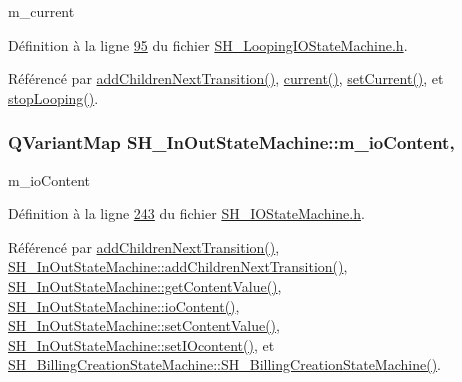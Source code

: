 m\-\_\-current 



Définition à la ligne \hyperlink{SH__LoopingIOStateMachine_8h_source_l00095}{95} du fichier \hyperlink{SH__LoopingIOStateMachine_8h_source}{S\-H\-\_\-\-Looping\-I\-O\-State\-Machine.\-h}.



Référencé par \hyperlink{classSh__LoopingInOutStateMachine_a20d5e4d9feea63bea747b45b7c10ca01}{add\-Children\-Next\-Transition()}, \hyperlink{classSh__LoopingInOutStateMachine_a6c642c84af6988031c4e2a85196eb2e6}{current()}, \hyperlink{classSh__LoopingInOutStateMachine_a48881465e2f21524dc8911ff94a60dca}{set\-Current()}, et \hyperlink{classSh__LoopingInOutStateMachine_a2ddae49a46de3794fd934f830d2388f8}{stop\-Looping()}.

\hypertarget{classSH__InOutStateMachine_a661a1c7bd3b1086b3b5cd60ca957ecbd}{
\subsubsection[{m\-\_\-io\-Content}]{\setlength{\rightskip}{0pt plus 5cm}Q\-Variant\-Map S\-H\-\_\-\-In\-Out\-State\-Machine\-::m\-\_\-io\-Content\hspace{0.3cm}{\ttfamily [protected]}, {\ttfamily [inherited]}}}\label{classSH__InOutStateMachine_a661a1c7bd3b1086b3b5cd60ca957ecbd}


m\-\_\-io\-Content 



Définition à la ligne \hyperlink{SH__IOStateMachine_8h_source_l00243}{243} du fichier \hyperlink{SH__IOStateMachine_8h_source}{S\-H\-\_\-\-I\-O\-State\-Machine.\-h}.



Référencé par \hyperlink{classSh__LoopingInOutStateMachine_a20d5e4d9feea63bea747b45b7c10ca01}{add\-Children\-Next\-Transition()}, \hyperlink{classSH__InOutStateMachine_aa78420f8778d7777809aad77eb8473b4}{S\-H\-\_\-\-In\-Out\-State\-Machine\-::add\-Children\-Next\-Transition()}, \hyperlink{classSH__InOutStateMachine_aa1a3bd3c0ea8a59b9bc916dc718eb9ca}{S\-H\-\_\-\-In\-Out\-State\-Machine\-::get\-Content\-Value()}, \hyperlink{classSH__InOutStateMachine_aaca105fbd5f5cc3bac115389ad3694c5}{S\-H\-\_\-\-In\-Out\-State\-Machine\-::io\-Content()}, \hyperlink{classSH__InOutStateMachine_a9ab1534306b2bdb62743d4bcefe40c17}{S\-H\-\_\-\-In\-Out\-State\-Machine\-::set\-Content\-Value()}, \hyperlink{classSH__InOutStateMachine_a8271a7ec7d5f6502449dd3b4da5f4155}{S\-H\-\_\-\-In\-Out\-State\-Machine\-::set\-I\-Ocontent()}, et \hyperlink{classSH__BillingCreationStateMachine_ad62b77fa4aeafe200056ff3974562f83}{S\-H\-\_\-\-Billing\-Creation\-State\-Machine\-::\-S\-H\-\_\-\-Billing\-Creation\-State\-Machine()}.

